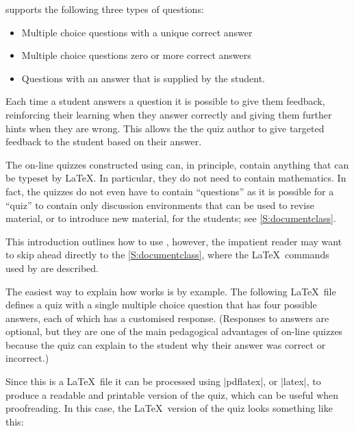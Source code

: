 \documentclass[svgnames]{article}
\begin{document}
    \WebQuiz supports the following three types of questions:
    \begin{itemize}
      \item Multiple choice questions with a unique correct answer
      \item Multiple choice questions zero or more correct answers
      \item Questions with an answer that is supplied by the student.
    \end{itemize}
    Each time a student answers a question it is possible to give them
    feedback, reinforcing their learning when they answer correctly and
    giving them further hints when they are wrong. This allows the the
    quiz author to give targeted feedback to the student based on their
    answer.

    The on-line quizzes constructed using \WebQuiz can, in principle,
    contain anything that can be typeset by \LaTeX. In particular, they
    do not need to contain mathematics. In fact, the quizzes do not even
    have to contain ``questions'' as it is possible for a \WebQuiz
    ``quiz'' to contain only \textsf{discussion} environments that can
    be used to revise material, or to introduce new material, for the
    students; see \autoref{S:documentclass}.

    This introduction outlines how to use \WebQuiz, however, the
    impatient reader may want to skip ahead directly to the
    \autoref{S:documentclass}, where the \LaTeX\ commands used by
    \WebQuiz are described.

    The easiest way to explain how \WebQuiz works is by example. The
    following \LaTeX\ file defines a quiz with a single multiple choice
    question that has four possible answers, each of which has a
    customised response.  (Responses to answers are optional, but they
    are one of the main pedagogical advantages of on-line quizzes
    because the quiz can explain to the student why their answer was
    correct or incorrect.)


    Since this is a \LaTeX\ file it can be processed using
    \BashCode|pdflatex|, or \BashCode|latex|, to produce a readable and
    printable version of the quiz, which can be useful when
    proofreading. In this case, the \LaTeX\ version of the quiz looks
    something like this:

\end{document}
